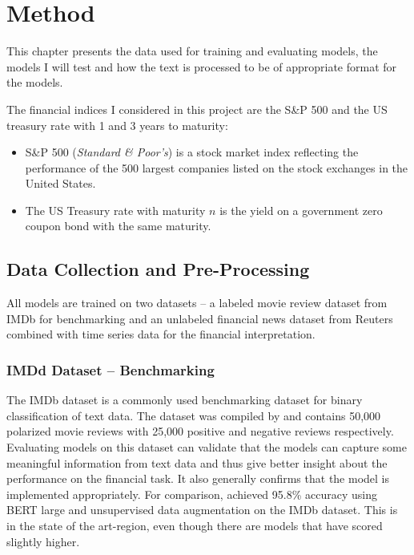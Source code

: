 \chapter{Method}

This chapter presents the data used for training and evaluating models, the models I will test and how the text is processed to be of appropriate format for the models. 

The financial indices I considered in this project are the S\&P 500 and the US treasury rate with 1 and 3 years to maturity:
\begin{itemize}
    \item S\&P 500 (\textit{Standard \& Poor's}) is a stock market index reflecting the performance of the 500 largest companies listed on the stock exchanges in the United States.
    \item The US Treasury rate with maturity $n$ is the yield on a government zero coupon bond with the same maturity. 
\end{itemize}


\section{Data Collection and Pre-Processing}

All models are trained on two datasets -- a labeled movie review dataset from IMDb for benchmarking and an unlabeled financial news dataset from Reuters combined with time series data for the financial interpretation. 

\subsection{IMDd Dataset -- Benchmarking}
The IMDb dataset is a commonly used benchmarking dataset for binary classification of text data. The dataset was compiled by \citet{maas-EtAl:2011:ACL-HLT2011} and contains 50,000 polarized movie reviews with 25,000 positive and negative reviews respectively. Evaluating models on this dataset can validate that the models can capture some meaningful information from text data and thus give better insight about the performance on the financial task. It also  generally confirms that the model is implemented appropriately. For comparison, \citeauthor{xie2019unsupervised} achieved 95.8\% accuracy using BERT large and unsupervised data augmentation on the IMDb dataset. This is in the state of the art-region, even though there are models that have scored slightly higher. 

